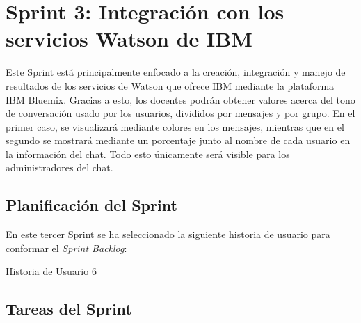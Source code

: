 \clearpage

\section{Sprint 3: Integración con los servicios Watson de IBM}
Este Sprint está principalmente enfocado a la creación, integración y manejo de resultados de los servicios de Watson que ofrece IBM mediante la plataforma IBM Bluemix. Gracias a esto, los docentes podrán obtener valores acerca del tono de conversación usado por los usuarios, divididos por mensajes y por grupo. En el primer caso, se visualizará mediante colores en los mensajes, mientras que en el segundo se mostrará mediante un porcentaje junto al nombre de cada usuario en la información del chat. Todo esto únicamente será visible para los administradores del chat.

\subsection{Planificación del Sprint}
En este tercer Sprint se ha seleccionado la siguiente historia de usuario para conformar el \textit{Sprint Backlog}:

\begin{table}[hp]
	\centering
	{\small
		
	}
	\caption[Historia de Usuario 6]
	{Historia de Usuario 6}
	\label{tab:historia6}
\end{table}

\subsection{Tareas del Sprint}
